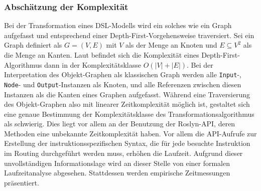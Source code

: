 \subsubsection{Abschätzung der Komplexität}
\label{subsubsec:Abschaetzung der Komplexitaet}
Bei der Transformation eines DSL-Modells wird ein solches wie ein Graph aufgefasst und entsprechend einer Depth-First-Vorgehensweise traversiert. Sei ein Graph definiert als $G = (V, E)$ mit $V$ als der Menge an Knoten und $E \subseteq V^{2}$ als die Menge an Kanten. Laut \cite[S. 479]{Cormen:90} befindet sich die Komplexität eines Depth-First-Algorithmus dann in der Komplexitätsklasse $O(\left\vert{V}\right\vert + \left\vert{E}\right\vert)$. Bei der Interpretation des Objekt-Graphen als klassischen Graph werden alle \texttt{Input}-, \texttt{Node}- und \texttt{Output}-Instanzen als Knoten, und alle Referenzen zwischen diesen Instanzen als die Kanten eines Graphen aufgefasst. Während eine Traversierung des Objekt-Graphen also mit linearer Zeitkomplexität möglich ist, gestaltet sich eine genaue Bestimmung der Komplexitätsklasse des Transformationsalgorithmus als schwierig. Dies liegt vor allem an der Benutzung der Roslyn-API, deren Methoden eine unbekannte Zeitkomplexität haben. Vor allem die API-Aufrufe zur Erstellung der instruktionsspezifischen Syntax, die für jede besuchte Instruktion im Routing durchgeführt werden muss, erhöhen die Laufzeit.
\newline
Aufgrund dieser unvollständigen Informationslage wird an dieser Stelle von einer formalen Laufzeitanalyse abgesehen. Stattdessen werden empirische Zeitmessungen präsentiert.

